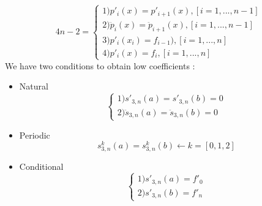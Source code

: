 \documentclass[12pt]{article}
\begin{document}
\begin{itemize}
\begin{equation}
  4n-2 = \begin{cases}
   1) p'_i(x) = p'_{i+1}(x) , [i = 1,...,n-1]\\
   2) \ddot{p}_i(x) = \ddot{p}_{i+1}(x) , [i = 1,...,n-1]\\
   3) p'_i(x_i) = f_{i-1}) , [i = 1,...,n]\\
   4) p'_i(x) = f_{i} , [i = 1,...,n]
  \end{cases}
\end{equation}
We have two conditions to obtain low coefficients :\\
\begin{itemize}
\item Natural \begin{equation}
 \begin{cases}
   1) s'_{3,n}(a) = s'_{3,n}(b) = 0\\
   2) \ddot{s}_{3,n}(a) = \ddot{s}_{3,n}(b) = 0
  \end{cases}
\end{equation}
\item Periodic 
\begin{equation}
s^{k}_{3,n}(a) = s^{k}_{3,n}(b) \leftarrow k = [0,1,2]
\end{equation}
\item Conditional
\begin{equation}
\begin{cases}
   1) s'_{3,n}(a) = f'_0\\
   2) s'_{3,n}(b) = f'_n
  \end{cases}
\end{equation}
\end{itemize} 


\end{itemize}
\end{document}
